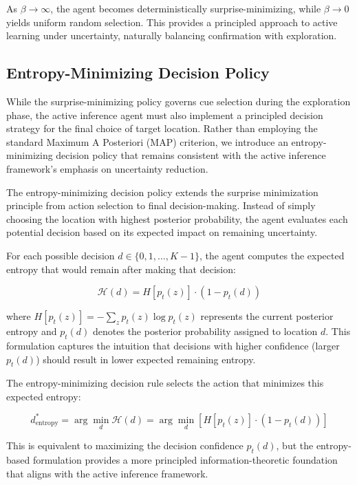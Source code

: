\documentclass{article}
\begin{document}
As $\beta \to \infty$, the agent becomes deterministically surprise-minimizing, while $\beta \to 0$ yields uniform random selection. This provides a principled approach to active learning under uncertainty, naturally balancing confirmation with exploration.

\subsection{Entropy-Minimizing Decision Policy}

While the surprise-minimizing policy governs cue selection during the exploration phase, the active inference agent must also implement a principled decision strategy for the final choice of target location. Rather than employing the standard Maximum A Posteriori (MAP) criterion, we introduce an entropy-minimizing decision policy that remains consistent with the active inference framework's emphasis on uncertainty reduction.

The entropy-minimizing decision policy extends the surprise minimization principle from action selection to final decision-making. Instead of simply choosing the location with highest posterior probability, the agent evaluates each potential decision based on its expected impact on remaining uncertainty.

For each possible decision $d \in \{0, 1, \ldots, K-1\}$, the agent computes the expected entropy that would remain after making that decision:

\begin{equation}
\mathcal{H}(d) = H[p_t(z)] \cdot (1 - p_t(d))
\end{equation}

where $H[p_t(z)] = -\sum_z p_t(z) \log p_t(z)$ represents the current posterior entropy and $p_t(d)$ denotes the posterior probability assigned to location $d$. This formulation captures the intuition that decisions with higher confidence (larger $p_t(d)$) should result in lower expected remaining entropy.

The entropy-minimizing decision rule selects the action that minimizes this expected entropy:

\begin{equation}
d^*_{\text{entropy}} = \arg\min_d \mathcal{H}(d) = \arg\min_d \left[ H[p_t(z)] \cdot (1 - p_t(d)) \right]
\end{equation}

This is equivalent to maximizing the decision confidence $p_t(d)$, but the entropy-based formulation provides a more principled information-theoretic foundation that aligns with the active inference framework.
\end{document}

